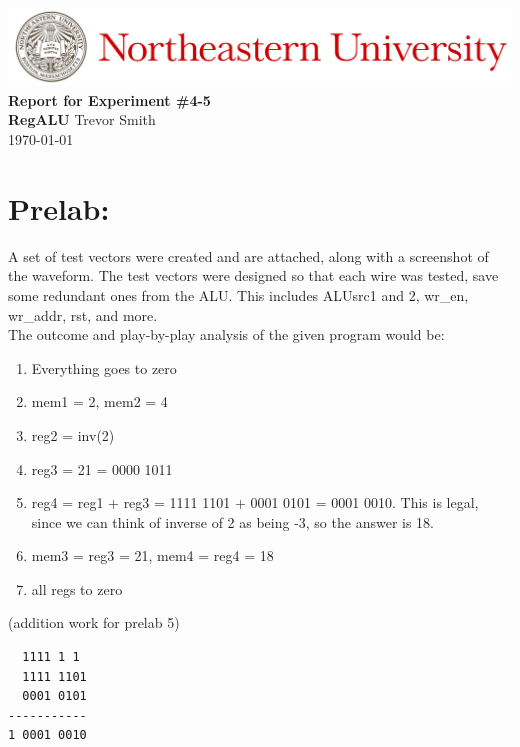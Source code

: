 \documentclass[12pt,a4paper]{article}
\begin{document}
\begin{center}
    \includegraphics[width=\textwidth]{./Images/Header.jpeg}
    \vfill
    \textbf{\Large{Report for Experiment \#4-5\\
    RegALU}}
    \vfill
    Trevor Smith\\
    \today
    \vfill
\end{center}

\newpage

\section*{Prelab:}

A set of test vectors were created and are attached, along with a screenshot
of the waveform. The test vectors were designed so that each wire was tested,
save some redundant ones from the ALU. This includes ALUsrc1 and 2, wr\_en,
wr\_addr, rst, and more. \\

The outcome and play-by-play analysis of the given program would be:
\begin{enumerate}
	\item Everything goes to zero
	\item mem1 = 2, mem2 = 4
	\item reg2 = inv(2)
	\item reg3 = 21 = 0000 1011
	\item reg4 = reg1 + reg3 = 1111 1101 + 0001 0101 = 0001 0010. This is legal,
		since we can think of inverse of 2 as being -3, so the answer is 18.
	\item mem3 = reg3 = 21, mem4 = reg4 = 18
	\item all regs to zero
\end{enumerate}

(addition work for prelab 5)
\begin{lstlisting}
  1111 1 1
  1111 1101
  0001 0101
-----------
1 0001 0010
\end{lstlisting}
\end{document}
